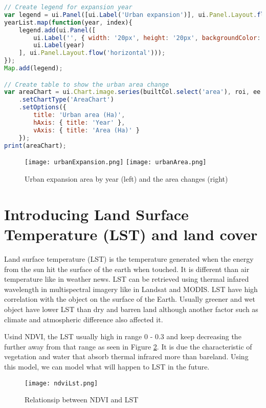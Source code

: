 \begin{lstlisting}[language=JavaScript, label={code:expansion}, caption={GEE Script to Model Urban Expansion}]
// Create legend for expansion year
var legend = ui.Panel([ui.Label('Urban expansion')], ui.Panel.Layout.flow('vertical'), { position: 'bottom-left' });
yearList.map(function(year, index){
	legend.add(ui.Panel([
		ui.Label('', { width: '20px', height: '20px', backgroundColor: dict.built_class_palette[index], border: '0.5px solid black' }),
		ui.Label(year)
	], ui.Panel.Layout.flow('horizontal')));
});
Map.add(legend);

// Create table to show the urban area change
var areaChart = ui.Chart.image.series(builtCol.select('area'), roi, ee.Reducer.sum(), 30, 'year')
	.setChartType('AreaChart')
	.setOptions({
		title: 'Urban area (Ha)',
		hAxis: { title: 'Year' },
		vAxis: { title: 'Area (Ha)' }
	});
print(areaChart);
\end{lstlisting}

\begin{figure}[htbp]
	\centering
	\label{fig:expansion}
	\texttt{[image: urbanExpansion.png]}
	\texttt{[image: urbanArea.png]}
	\caption{Urban expansion area by year (left) and the area changes (right)}
\end{figure}

\section{Introducing Land Surface Temperature (LST) and land cover}
Land surface temperature (LST) is the temperature generated when the energy from the sun hit the surface of the earth when touched. It is different than air temperature like in weather news. LST can be retrieved using thermal infared wavelength in multispectral imagery like in Landsat and MODIS. LST have high correlation with the object on the surface of the Earth. Usually greener and wet object have lower LST than dry and barren land although another factor such as climate and atmospheric difference also affected it.

Usind NDVI, the LST usually high in range 0 - 0.3 and keep decreasing the further away from that range as seen in Figure \ref{fig:ndviLst}. It is due the characteristic of vegetation and water that absorb thermal infrared more than bareland. Using this model, we can model what will happen to LST in the future.

\begin{figure}[htbp]
	\label{fig:ndviLst}
	\centering
	\texttt{[image: ndviLst.png]}
	\caption{Relationsip between NDVI and LST}
\end{figure}

